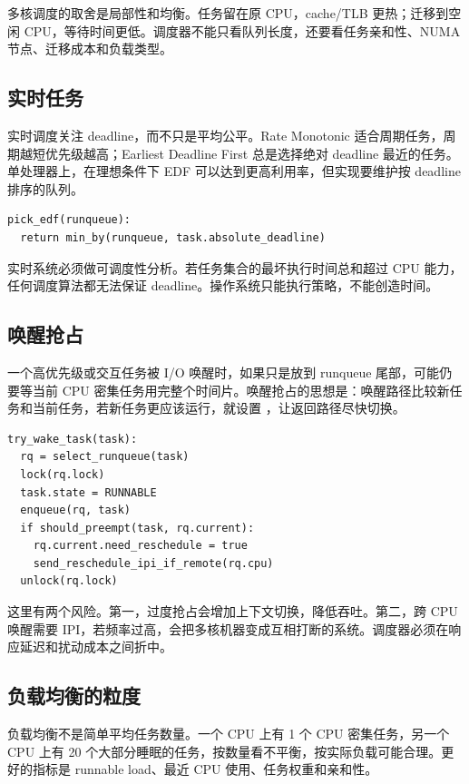 多核调度的取舍是局部性和均衡。任务留在原 CPU，cache/TLB 更热；迁移到空闲 CPU，等待时间更低。调度器不能只看队列长度，还要看任务亲和性、NUMA 节点、迁移成本和负载类型。

\subsection{实时任务}

实时调度关注 deadline，而不只是平均公平。Rate Monotonic 适合周期任务，周期越短优先级越高；Earliest Deadline First 总是选择绝对 deadline 最近的任务。单处理器上，在理想条件下 EDF 可以达到更高利用率，但实现要维护按 deadline 排序的队列。

\begin{lstlisting}
pick_edf(runqueue):
  return min_by(runqueue, task.absolute_deadline)
\end{lstlisting}

实时系统必须做可调度性分析。若任务集合的最坏执行时间总和超过 CPU 能力，任何调度算法都无法保证 deadline。操作系统只能执行策略，不能创造时间。

\subsection{唤醒抢占}

一个高优先级或交互任务被 I/O 唤醒时，如果只是放到 runqueue 尾部，可能仍要等当前 CPU 密集任务用完整个时间片。唤醒抢占的思想是：唤醒路径比较新任务和当前任务，若新任务更应该运行，就设置 ，让返回路径尽快切换。

\begin{lstlisting}
try_wake_task(task):
  rq = select_runqueue(task)
  lock(rq.lock)
  task.state = RUNNABLE
  enqueue(rq, task)
  if should_preempt(task, rq.current):
    rq.current.need_reschedule = true
    send_reschedule_ipi_if_remote(rq.cpu)
  unlock(rq.lock)
\end{lstlisting}

这里有两个风险。第一，过度抢占会增加上下文切换，降低吞吐。第二，跨 CPU 唤醒需要 IPI，若频率过高，会把多核机器变成互相打断的系统。调度器必须在响应延迟和扰动成本之间折中。

\subsection{负载均衡的粒度}

负载均衡不是简单平均任务数量。一个 CPU 上有 1 个 CPU 密集任务，另一个 CPU 上有 20 个大部分睡眠的任务，按数量看不平衡，按实际负载可能合理。更好的指标是 runnable load、最近 CPU 使用、任务权重和亲和性。

